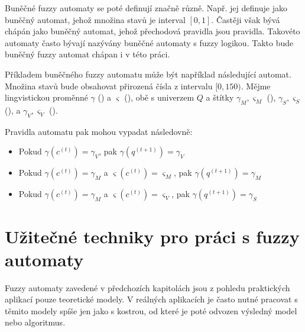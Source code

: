 Buněčné fuzzy automaty se poté definují značně různě. Např. \cite{For-FuzCelAutConjNormForm, MraZimLapBaj-FuzCelAut+} jej definuje jako buněčný automat, jehož množina stavů je interval $[0,1]$. Častěji však bývá chápán jako buněčný automat, jehož přechodová pravidla jsou \ifthen pravidla. Takovéto automaty často bývají nazývány buněčné automaty s fuzzy logikou. Takto bude buněčný fuzzy automat chápan i v této práci.


\begin{example}
 Příkladem buněčného fuzzy automatu může být například následující automat. Množina stavů bude obsahovat přirozená čísla z intervalu $[0, 150)$. Mějme lingvistickou proměnné $\gamma$ () a $\varsigma$ (), obě s univerzem $Q$ a štítky $\gamma_M, \varsigma_M$ (), $\gamma_S, \varsigma_S$ (), a $\gamma_V, \varsigma_V$ (). 

 Pravidla automatu pak mohou vypadat následovně:
 \begin{itemize}
  \item Pokud $\gamma(c^{(t)}) = \gamma_V$, 						pak $\gamma(q^{(t+1)}) = \gamma_V$
  \item Pokud $\gamma(c^{(t)}) = \gamma_M$ a $\varsigma(c^{(t)}) = \varsigma_M$, 	pak $\gamma(q^{(t+1)}) = \gamma_M$
  \item Pokud $\gamma(c^{(t)}) = \gamma_M$ a $\varsigma(c^{(t)}) = \varsigma_V$, 	pak $\gamma(q^{(t+1)}) = \gamma_S$
 \end{itemize}
\end{example}




\section{Užitečné techniky pro práci s fuzzy automaty}

Fuzzy automaty zavedené v předchozích kapitolách jsou z pohledu praktických aplikací pouze teoretické modely. V reálných aplikacích je často nutné pracovat s těmito modely spíše jen jako s kostrou, od které je poté odvozen výsledný model nebo algoritmus.

